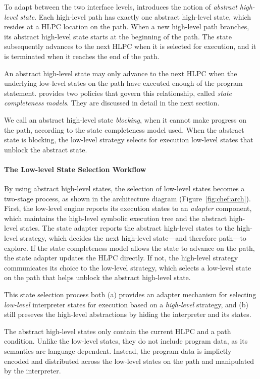 To adapt between the two interface levels, \chef introduces the notion of \emph{abstract high-level state}.
%
Each high-level path has exactly one abstract high-level state, which resides at a HLPC location on the path.
%
When a new high-level path branches, its abstract high-level state starts at the beginning of the path.
%
The state subsequently advances to the next HLPC when it is selected for execution, and it is terminated when it reaches the end of the path.


An abstract high-level state may only advance to the next HLPC when the underlying low-level states on the path have executed enough of the program statement.
%
\chef provides two policies that govern this relationship, called \emph{state completeness models}.  They are discussed in detail in the next section.


We call an abstract high-level state \emph{blocking}, when it cannot make progress on the path, according to the state completeness model used.
%
When the abstract state is blocking, the low-level strategy selects for execution low-level states that unblock the abstract state.

\paragraph{The Low-level State Selection Workflow}

By using abstract high-level states, the selection of low-level states becomes a two-stage process, as shown in the architecture diagram (Figure~\ref{fig:chef:arch}).
%
First, the low-level engine reports its execution states to an \emph{adapter} component, which maintains the high-level symbolic execution tree and the abstract high-level states.
%
The state adapter reports the abstract high-level states to the high-level strategy, which decides the next high-level state---and therefore path---to explore.
%
If the state completeness model allows the state to advance on the path, the state adapter updates the HLPC directly.
%
If not, the high-level strategy communicates its choice to the low-level strategy, which selects a low-level state on the path that helps unblock the abstract high-level state.


This state selection process both (a) provides an adapter mechanism for selecting \emph{low-level} interpreter states for execution based on a \emph{high-level} strategy, and (b) still preseves the high-level abstractions by hiding the interpreter and its states.


The abstract high-level states only contain the current HLPC and a path condition.
%
Unlike the low-level states, they do not include program data, as its semantics are language-dependent.
%
Instead, the program data is implictly encoded and distributed across the low-level states on the path and manipulated by the interpreter.

